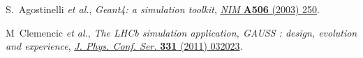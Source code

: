\documentclass{JINST}
\theoremstyle{definition}
\theoremstyle{remark}
\begin{document}
\begin{thebibliography}{9}
S.~Agostinelli {\em et al.},
\emph{Geant4: a simulation toolkit},
\href{http://dx.doi.org/10.1016/S0168-9002(03)01368-8}
{\emph{NIM} {\bf A506} (2003) 250}.

M~Clemencic {\em et al.},
\emph{The LHCb simulation application, GAUSS : design, evolution and experience},
\href{http://dx.doi.org/10.1088/1742-6596/331/3/032023}
{\emph{J. Phys. Conf. Ser.} {\bf 331} (2011) 032023}.










\end{thebibliography}

\appendix

%
\end{document}
